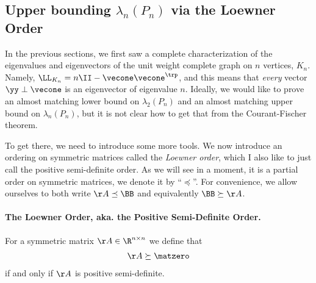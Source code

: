

\subsection{Upper bounding $\lambda_n(P_n)$ via the Loewner Order}

In the previous sections, we first saw a complete characterization of the
eigenvalues and eigenvectors of the unit weight complete graph on $n$
vertices, $K_n$. Namely, $\LL_{K_n} = n\II - \vecone \vecone^\trp$, and
this means that \emph{every} vector $\yy \perp \vecone$ is an
eigenvector of eigenvalue $n$. Ideally, we would like to prove an almost matching lower bound on
$\lambda_2(P_n)$ and an almost matching upper bound on $\lambda_n(P_n)$, but it
is not clear how to get that from the Courant-Fischer theorem.

To get there, we need to introduce some more tools. We now introduce an ordering on symmetric matrices called the
\emph{Loewner order}, which I also like to just call the positive
semi-definite order.
As we will see in a moment, it is a partial order on symmetric matrices, we denote
it by ``$\preceq$''.
For convenience, we allow ourselves to both write  $\AA \preceq \BB$
and equivalently $\BB \succeq \AA$.

\paragraph{The Loewner Order, aka. the Positive Semi-Definite Order.} 

For a symmetric matrix $\AA \in \R^{n \times n}$ we define that
\begin{align*}
\AA \succeq \matzero
\end{align*}
if and only if $\AA$ is positive semi-definite.

